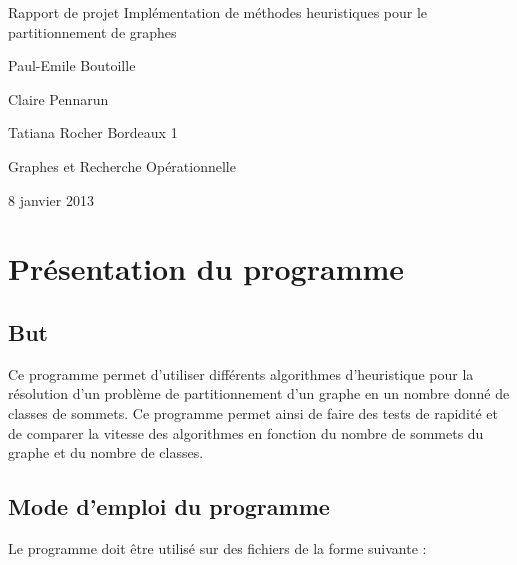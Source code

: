 \documentclass[12pt]{article}
\begin{document}
\begin{titlepage}
\begin{center}

\hfill
\vfill
\bigskip
\huge{Rapport de projet} 
\vfill
\bigskip 
\Huge 
\bigskip Implémentation de méthodes heuristiques pour le partitionnement de graphes \par 
\vfill
\Large Paul-Emile Boutoille \par
		Claire Pennarun \par 
		Tatiana Rocher
\vfill
\Large Bordeaux 1 \par \Large Graphes et Recherche Opérationnelle		
		\bigskip 
\bigskip

\Large
8 janvier 2013
\end{center}
\end{titlepage}

\tableofcontents
\newpage


\section{Présentation du programme}

\subsection{But}

Ce programme permet d’utiliser différents algorithmes d’heuristique pour la résolution d’un problème de partitionnement d’un graphe en un nombre donné de classes de sommets. Ce programme permet ainsi de faire des tests de rapidité et de comparer la vitesse des algorithmes en fonction du nombre de sommets du graphe et du nombre de classes.

\subsection{Mode d'emploi du programme}

Le programme doit être utilisé sur des fichiers de la forme suivante :

\bigskip 

\end{document}

